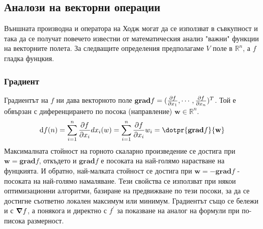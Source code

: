 \documentclass[12pt]{article}
\begin{document}
\begin{large}
\subsection{Аналози на векторни операции}
Външната производна и оператора на Ходж могат да се използват в съвкупност и така да се получат повечето известни от математическия анализ "важни" функции на векторните полета.
За следващите определения предполагаме $V$ поле в $\mathbb{R}^n$, а $f$ гладка фунцкия.

\subsubsection*{Градиент}
Градиентът на $f$ ни дава векторното поле $\mathbf{grad} f=(\pdv{f}{x_1},\cdots,\pdv{f}{x_n})^T$. Той е обвързан с диференцирането по посока (направление) $\mathbf{w} \in \mathbb{R}^n$.
\[
\dd f(n)=\sum_{i=1}^{n} \pdv{f}{x_i}dx_i(w)=\sum_{i=1}^{n} \pdv{f}{x_i}w_i=\dotpr{\mathbf{grad}f}{\mathbf{w}}
\] 
Максималната стойност на горното скаларно произведение се достига при $\mathbf{w}=\mathbf{grad}f$, откъдето и $\mathbf{grad}f$ е посоката на най-голямо нарастване на фунцкията. И обратно, най-малката стойност се достига при $\mathbf{w}=-\mathbf{grad}f$ - посоката на най-голямо намаляване. Тези свойства се използват при някои оптимизационни алгоритми, базиране на предвижване по тези посоки, за да се достигне съответно локален максимум или минимум.
Градиентът също се бележи и с $\grad f$, а понякога и директно с $f^\prime$ за показване на аналог на формули при по-писока размерност.


\end{large}
\end{document}
